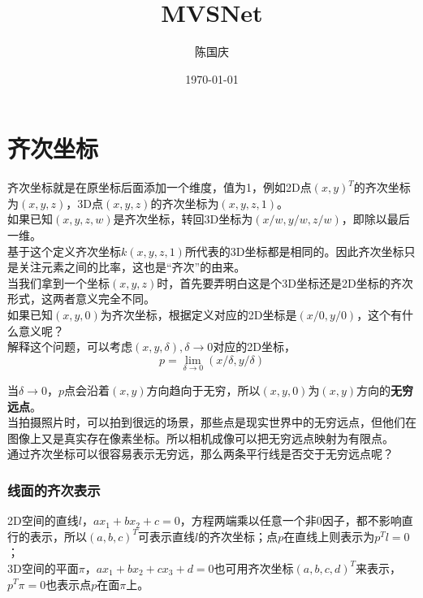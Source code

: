 \documentclass[hpyerref,UTF8,a4paper,titlepage,12pt,oneside]{ctexbook}
\title{MVSNet}
\author{陈国庆}
\date{\today}
\theoremstyle{definition}
\begin{document}
\maketitle
\tableofcontents

\section{齐次坐标}
	齐次坐标就是在原坐标后面添加一个维度，值为1，例如2D点$(x,y)^T$的齐次坐标为$(x,y,z)$，3D点$(x,y,z)$的齐次坐标为$(x,y,z,1)$。\\

	如果已知$(x,y,z,w)$是齐次坐标，转回3D坐标为$(x/w,y/w,z/w)$，即除以最后一维。\\

	基于这个定义齐次坐标$k(x,y,z,1)$所代表的3D坐标都是相同的。因此齐次坐标只是关注元素之间的比率，这也是“齐次”的由来。\\

	当我们拿到一个坐标$(x,y,z)$时，首先要弄明白这是个3D坐标还是2D坐标的齐次形式，这两者意义完全不同。\\

	如果已知$(x,y,0)$为齐次坐标，根据定义对应的2D坐标是$(x/0,y/0)$，这个有什么意义呢？\\

	解释这个问题，可以考虑$(x,y,\delta), \delta\rightarrow 0$对应的2D坐标，
	$$
		p = \lim_{\delta\rightarrow 0} (x/\delta, y/\delta)
	$$

	当$\delta\rightarrow 0$，$p$点会沿着$(x,y)$方向趋向于无穷，所以$(x,y,0)$为$(x,y)$方向的\textbf{无穷远点}。\\

	当拍摄照片时，可以拍到很远的场景，那些点是现实世界中的无穷远点，但他们在图像上又是真实存在像素坐标。所以相机成像可以把无穷远点映射为有限点。\\

	通过齐次坐标可以很容易表示无穷远，那么两条平行线是否交于无穷远点呢？

	\subsubsection*{线面的齐次表示}
		2D空间的直线$l$，$ax_1 + bx_2 +c =0$，方程两端乘以任意一个非0因子，都不影响直行的表示，所以$(a,b,c)^T$可表示直线$l$的齐次坐标；点$p$在直线上则表示为$p^Tl = 0$；\\

		3D空间的平面$\pi$，$ax_1 + bx_2 + cx_3 +d = 0$也可用齐次坐标$(a,b,c,d)^T$来表示，$p^T\pi = 0$也表示点$p$在面$\pi$上。\\
\end{document}
